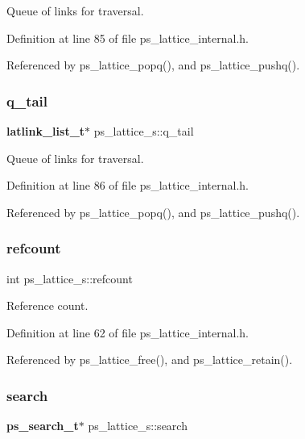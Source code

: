 Queue of links for traversal. 



Definition at line 85 of file ps\+\_\+lattice\+\_\+internal.\+h.



Referenced by ps\+\_\+lattice\+\_\+popq(), and ps\+\_\+lattice\+\_\+pushq().

\mbox{\label{structps__lattice__s_a5a9faf5e4aabd84a868d1bff97dd9814}} 
\subsubsection{q\+\_\+tail}
{\footnotesize\ttfamily \textbf{ latlink\+\_\+list\+\_\+t}$\ast$ ps\+\_\+lattice\+\_\+s\+::q\+\_\+tail}



Queue of links for traversal. 



Definition at line 86 of file ps\+\_\+lattice\+\_\+internal.\+h.



Referenced by ps\+\_\+lattice\+\_\+popq(), and ps\+\_\+lattice\+\_\+pushq().

\mbox{\label{structps__lattice__s_a6d66b392dec016b3304da2f53be17dd1}} 
\subsubsection{refcount}
{\footnotesize\ttfamily int ps\+\_\+lattice\+\_\+s\+::refcount}



Reference count. 



Definition at line 62 of file ps\+\_\+lattice\+\_\+internal.\+h.



Referenced by ps\+\_\+lattice\+\_\+free(), and ps\+\_\+lattice\+\_\+retain().

\mbox{\label{structps__lattice__s_a9ebaeb7be7a83980569f0c544eb6babb}} 
\subsubsection{search}
{\footnotesize\ttfamily \textbf{ ps\+\_\+search\+\_\+t}$\ast$ ps\+\_\+lattice\+\_\+s\+::search}



